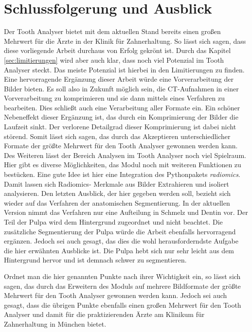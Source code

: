 \chapter{Schlussfolgerung und Ausblick}
\label{chap:schlussfolgerung} Der Tooth Analyser bietet mit dem aktuellen Stand bereits
einen großen Mehrwert für die Ärzte in der Klinik für Zahnerhaltung. So lässt
sich sagen, dass diese vorliegende Arbeit durchaus von Erfolg gekrönt ist. Durch
das Kapitel \ref{sec:limitierungen} wird aber auch klar, dass noch viel Potenzial
im Tooth Analyser steckt. Das meiste Potenzial ist hierbei in den Limitierungen
zu finden. Eine hervorragende Ergänzung dieser Arbeit würde eine Vorverarbeitung
der Bilder bieten. Es soll also in Zukunft möglich sein, die \ac{CT}-Aufnahmen in einer
Vorverarbeitung zu komprimieren und sie dann mittels eines Verfahren zu bearbeiten.
Dies schließt auch eine Verarbeitung aller Formate ein. Ein schöner Nebeneffekt dieser
Ergänzung ist, das durch ein Komprimierung der Bilder die Laufzeit sinkt. Der verlorene
Detailgrad dieser Komprimierung ist dabei nicht störend. Somit lässt sich sagen,
das durch das Akzeptieren unterschiedlicher Formate der größte Mehrwert für den Tooth
Analyser gewonnen werden kann. Des Weiteren lässt der Bereich Analysen im Tooth
Analyser noch viel Spielraum. Hier gibt es diverse Möglichkeiten, das Modul noch
mit weiteren Funktionen zu bestücken. Eine gute Idee ist hier eine Integration des
Pythonpakets \textit{radiomics}. Damit lassen sich Radiomics- Merkmale aus
Bilder Extrahieren und isoliert analysieren. Den letzten Ausblick, der hier
gegeben werden soll, bezieht sich wieder auf das Verfahren der anatomischen Segmentierung.
In der aktuellen Version nimmt das Verfahren nur eine Aufteilung in Schmelz und
Dentin vor. Der Teil der Pulpa wird dem Hintergrund zugeordnet und nicht beachtet.
Die zusätzliche Segmentierung der Pulpa würde die Arbeit ebenfalls hervorragend
ergänzen. Jedoch sei auch gesagt, das dies die wohl herausforderndste Aufgabe
die hier erwähnten Ausblicke ist. Die Pulpa hebt sich nur sehr leicht aus dem Hintergrund
hervor und ist demnach schwer zu segmentieren.

Ordnet man die hier genannten Punkte nach ihrer Wichtigkeit ein, so lässt sich
sagen, das durch das Erweitern des Moduls auf mehrere Bildformate der größte Mehrwert
für den Tooth Analyser gewonnen werden kann. Jedoch sei auch gesagt, dass die übrigen
Punkte ebenfalls einen großen Mehrwert für den Tooth Analyser und damit für die praktizierenden
Ärzte am Klinikum für Zahnerhaltung in München bietet.
